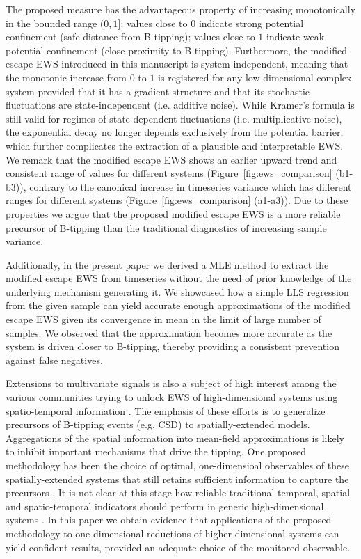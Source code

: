 \documentclass[a4paper,fleqn]{cas-sc}
\newcommand{\fref}[1]{Figure~\ref{#1}}
\begin{document}
The proposed measure has the advantageous property of increasing monotonically in the bounded range $(0,1]$: values close to $0$ indicate strong potential confinement (safe distance from B-tipping); values close to $1$ indicate weak potential confinement (close proximity to B-tipping).
Furthermore, the modified escape EWS introduced in this manuscript is system-independent, meaning that the monotonic increase from $0$ to $1$ is registered for any low-dimensional complex system provided that it has a gradient structure and that its stochastic fluctuations are state-independent (i.e. additive noise).
While Kramer's formula is still valid for regimes of state-dependent fluctuations (i.e. multiplicative noise), the exponential decay no longer depends exclusively from the potential barrier, which further complicates the extraction of a plausible and interpretable EWS.
We remark that the modified escape EWS shows an earlier upward trend and consistent range of values for different systems (\fref{fig:ews_comparison} (b1-b3)), contrary to the canonical increase in timeseries variance which has different ranges for different systems (\fref{fig:ews_comparison} (a1-a3)).
Due to these properties we argue that the proposed modified escape EWS is a more reliable precursor of B-tipping than the traditional diagnostics of increasing sample variance.
 
Additionally, in the present paper we derived a MLE method to extract the modified escape EWS from timeseries without the need of prior knowledge of the underlying mechanism generating it.
We showcased how a simple LLS regression from the given sample can yield accurate enough approximations of the modified escape EWS given its convergence in mean in the limit of large number of samples.
We observed that the approximation becomes more accurate as the system is driven closer to B-tipping, thereby providing a consistent prevention against false negatives.

Extensions to multivariate signals is also a subject of high interest among the various communities trying to unlock EWS of high-dimensional systems using spatio-temporal information \cite{Donovan2015,Rodal2022,Lohmann2024,Dijkstra2026}.
The emphasis of these efforts is to generalize precursors of B-tipping events (e.g. CSD) to spatially-extended models.
        Aggregations of the spatial information into mean-field approximations is likely to inhibit important mechanisms that drive the tipping.
        One proposed methodology has been the choice of optimal, one-dimensioal observables of these spatially-extended systems that still retains sufficient information to capture the precursors \cite{Lohmann2025b}.
        It is not clear at this stage how reliable traditional temporal, spatial and spatio-temporal indicators should perform in generic high-dimensional systems \cite{Robinson2025}.
        In this paper we obtain evidence that applications of the proposed methodology to one-dimensional reductions of higher-dimensional systems can yield confident results, provided an adequate choice of the monitored observable.
\end{document}
